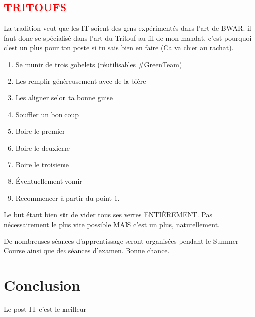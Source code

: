 \documentclass[12pt]{article}
\begin{document}
	\subsection{\textcolor{red}{TRITOUFS}}
		
		La tradition veut que les IT soient des gens expérimentés dans l’art de BWAR. il faut donc se spécialisé dans l’art du Tritouf au fil de mon mandat, c’est pourquoi c’est un plus pour ton poste si tu sais bien en faire (Ca va chier au rachat). 
		
		\begin{enumerate}
			\item Se munir de trois gobelets (réutilisables \#GreenTeam) 
			\item Les remplir généreusement avec de la bière
			\item Les aligner selon ta bonne guise 
			\item Souffler un bon coup 
			\item Boire le premier 
			\item Boire le deuxieme
			\item Boire le troisieme
			\item Éventuellement vomir
			\item Recommencer à partir du point 1. 

		\end{enumerate}
		
		Le but étant bien sûr de vider tous ses verres ENTIÈREMENT. Pas nécessairement le plus vite possible MAIS c’est un plus, naturellement.   


		De nombreuses séances d'apprentissage seront organisées pendant le Summer Course ainsi que des séances d’examen. Bonne chance. 


\section{Conclusion}
	Le post IT c'est le meilleur
		
		
\end{document}
